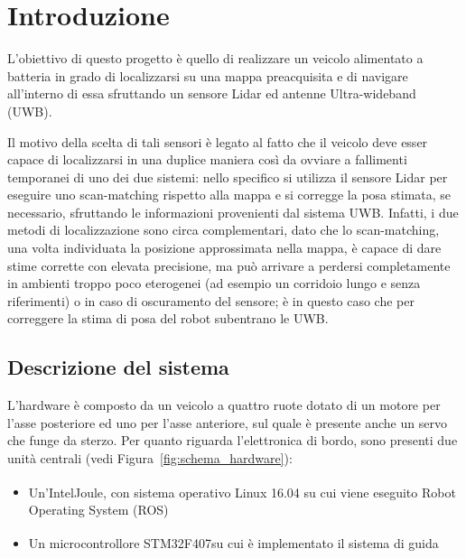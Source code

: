 
\chapter{Introduzione}

L’obiettivo di questo progetto è quello di realizzare un veicolo alimentato a batteria in grado di localizzarsi su una mappa preacquisita e di navigare all’interno di essa sfruttando un sensore Lidar ed antenne Ultra-wideband (UWB).

Il motivo della scelta di tali sensori è legato al fatto che il veicolo deve esser capace di localizzarsi in una duplice maniera così da ovviare a fallimenti temporanei di uno dei due sistemi: nello specifico si utilizza il sensore Lidar per eseguire uno scan-matching rispetto alla mappa e si corregge la posa stimata, se necessario, sfruttando le informazioni provenienti dal sistema UWB. 
Infatti, i due metodi di localizzazione sono circa complementari, dato che lo scan-matching, una volta individuata la posizione approssimata nella mappa, è capace di dare stime corrette con elevata precisione, ma può arrivare a perdersi completamente in ambienti troppo poco eterogenei (ad esempio un corridoio lungo e senza riferimenti) o in caso di oscuramento del sensore; è in questo caso che per correggere la stima di posa del robot subentrano le UWB.

\section{Descrizione del sistema}
\label{section1.1}
L’hardware è composto da un veicolo a quattro ruote dotato di un motore per l'asse posteriore ed uno per l'asse anteriore, sul quale è presente anche un servo che funge da sterzo.
Per quanto riguarda l'elettronica di bordo, sono presenti due unità centrali (vedi Figura~\ref{fig:schema_hardware}):
\begin{itemize}
    \item Un’Intel\textsuperscript\textregistered Joule\texttrademark, con sistema operativo Linux 16.04 su cui viene eseguito Robot Operating System (ROS)
    \item Un microcontrollore STM32F407\textsuperscript\textregistered \hspace{1mm}su cui è implementato il sistema di guida
\end{itemize}

